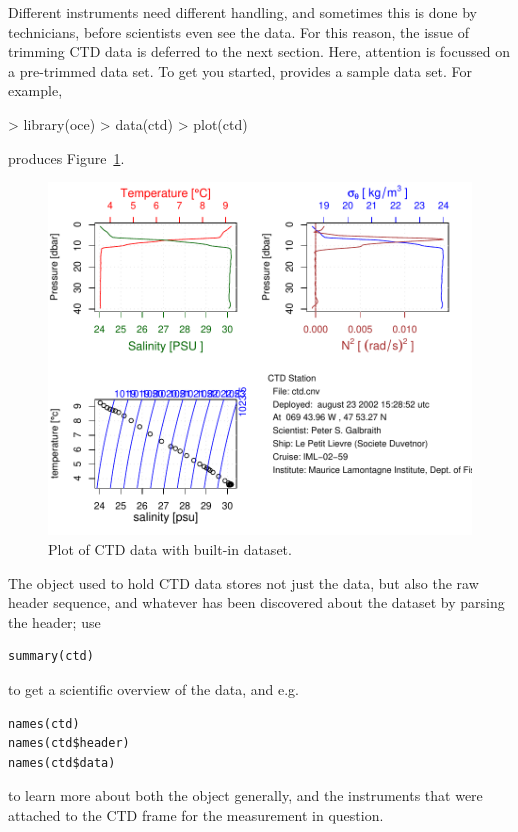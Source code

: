 \documentclass{article}
\begin{document}
Different instruments need different handling, and sometimes this is done by technicians,
before scientists even see the data. For this reason, the issue of trimming CTD data is
deferred to the next section. Here, attention is focussed on a pre-trimmed data set. To get
you started, \verb@oce@ provides a sample data set. For example,
\begin{Schunk}
\begin{Sinput}
> library(oce)
> data(ctd)
> plot(ctd)
\end{Sinput}
\end{Schunk}
produces Figure~\ref{fig:ctd}.
\begin{figure}
\begin{center}
\includegraphics{oce-ctdfig}
\end{center}
\caption{Plot of CTD data with built-in dataset.}
\label{fig:ctd}
\end{figure}

The object used to hold CTD data stores not just the data, but also the raw header sequence, and
whatever has been discovered about the dataset by parsing the header; use
\begin{verbatim}
summary(ctd)
\end{verbatim}
to get a scientific overview of the data, and e.g.
\begin{verbatim}
names(ctd)
names(ctd$header)
names(ctd$data)
\end{verbatim}
to learn more about both the \verb@ctd@ object generally, and the instruments
that were attached to the CTD frame for the measurement in question.
\end{document}
